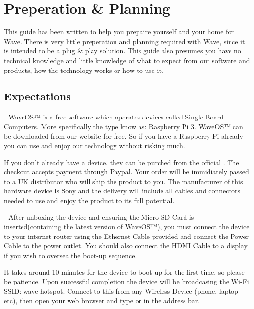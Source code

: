 \documentclass[letterpaper,10pt,openany,oneside,english]{sphinxmanual}
\begin{document}
\section{Preperation \& Planning}
\label{\detokenize{preperation:preperation-planning}}\label{\detokenize{preperation::doc}}
This guide has been written to help you prepaire yourself and your home for Wave.
There is very little preperation and planning required with Wave, since it is intended to be a plug \& play solution.
This guide also presumes you have no technical knowledge and little knowledge of what to expect from our software and products, how the technology works or how to use it.


\subsection{Expectations}
\label{\detokenize{preperation:expectations}}
 - WaveOS™ is a free software which operates devices called Single Board Computers. More specifically the type know as: Raspberry Pi 3. WaveOS™ can be downloaded from our website for free. So if you have a Raspberry Pi already you can use and enjoy our technology without risking much.

If you don’t already have a device, they can be purched from the official . The checkout accepts payment through Paypal. Your order will be immidiately passed to a UK distributor who will ship the product to you. The manufacturer of this hardware device is Sony and the delivery will include all cables and connectors needed to use and enjoy the product to its full potential.

 - After unboxing the device and ensuring the Micro SD Card is inserted(containing the latest version of WaveOS™), you must connect the device to your internet router using the Ethernet Cable provided and connect the Power Cable to the power outlet. You should also connect the HDMI Cable to a display if you wish to oversea the boot-up sequence.

It takes around 10 minutes for the device to boot up for the first time, so please be patience. Upon successful completion the device will be broadcasing the Wi-Fi SSID: wave-hotspot. Connect to this from any Wireless Device (phone, laptop etc), then open your web browser and type  or  in the address bar.
\end{document}
